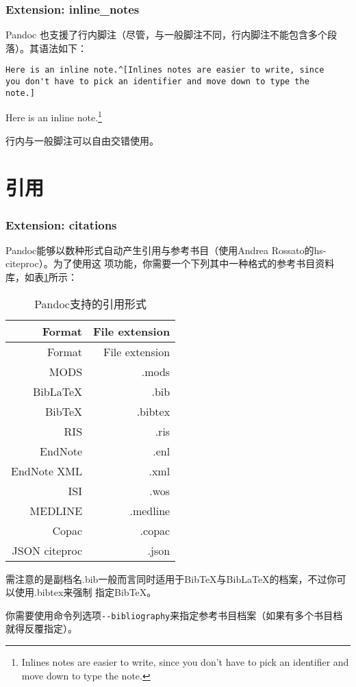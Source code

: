 \documentclass[fancyhdr,bookmark]{ctexbook}
\begin{document}
\subsubsection{Extension: inline\_notes}\label{extension-inline_notes}

Pandoc
也支援了行内脚注（尽管，与一般脚注不同，行内脚注不能包含多个段落）。其语法如下：

\begin{lstlisting}
Here is an inline note.^[Inlines notes are easier to write, since
you don't have to pick an identifier and move down to type the
note.]
\end{lstlisting}

Here is an inline note.\footnote{Inlines notes are easier to write,
  since you don't have to pick an identifier and move down to type the
  note.}

行内与一般脚注可以自由交错使用。

\section{引用}\label{ux5f15ux7528-1}

\subsubsection{Extension: citations}\label{extension-citations}

Pandoc能够以数种形式自动产生引用与参考书目（使用Andrea
Rossato的hs-citeproc）。为了使用这
项功能，你需要一个下列其中一种格式的参考书目资料库，如表\ref{table:citations}所示：

\begin{longtable}[]{@{}rr@{}}
\caption{\label{table:citations}Pandoc支持的引用形式}\tabularnewline
\toprule
Format & File extension\tabularnewline
\midrule
\endfirsthead
\toprule
Format & File extension\tabularnewline
\midrule
\endhead
MODS & .mods\tabularnewline
BibLaTeX & .bib\tabularnewline
BibTeX & .bibtex\tabularnewline
RIS & .ris\tabularnewline
EndNote & .enl\tabularnewline
EndNote XML & .xml\tabularnewline
ISI & .wos\tabularnewline
MEDLINE & .medline\tabularnewline
Copac & .copac\tabularnewline
JSON citeproc & .json\tabularnewline
\bottomrule
\end{longtable}

需注意的是副档名.bib一般而言同时适用于BibTeX与BibLaTeX的档案，不过你可以使用.bibtex来强制
指定BibTeX。

你需要使用命令列选项\lstinline!--bibliography!来指定参考书目档案（如果有多个书目档就得反覆指定）。
\end{document}
